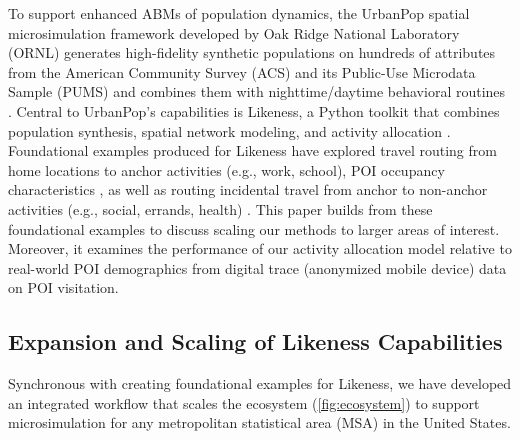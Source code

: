 To support enhanced ABMs of population dynamics, the UrbanPop spatial microsimulation framework developed by Oak Ridge National Laboratory (ORNL) generates high-fidelity synthetic populations on hundreds of attributes from the American Community Survey (ACS) and its Public-Use Microdata Sample (PUMS) and combines them with nighttime/daytime behavioral routines \cite{urbanpop-AG-2023}. Central to UrbanPop's capabilities is Likeness, a Python toolkit that combines population synthesis, spatial network modeling, and activity allocation \cite{likeness-scipy-paper-2022, likeness-scipy-poster-2022}. Foundational examples produced for Likeness have explored travel routing from home locations to anchor activities (e.g., work, school), POI occupancy characteristics \cite{likeness-scipy-paper-2022, likeness-scipy-poster-2022}, as well as routing incidental travel from anchor to non-anchor activities (e.g., social, errands, health) \cite{likeness_aag_2023}. This paper builds from these foundational examples to
discuss scaling our methods to larger areas of interest. Moreover, it examines the performance of our activity allocation model relative to real-world POI demographics from digital trace (anonymized mobile device) data on POI visitation.

\subsection{Expansion and Scaling of Likeness Capabilities}\label{section:likeness-expansion-scaling}



Synchronous with creating foundational examples for Likeness, we have developed an integrated workflow that scales the ecosystem (\autoref{fig:ecosystem}) to support microsimulation for any metropolitan statistical area (MSA) in the United States.

